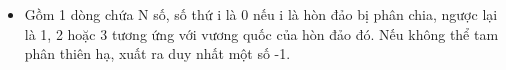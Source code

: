\begin{itemize}
	\item     Gồm 1 dòng chứa N số, số thứ i là 0 nếu i là hòn đảo bị phân chia, ngược lại là 1, 2 hoặc 3 tương ứng với vương quốc của hòn đảo đó. Nếu không thể tam phân thiên hạ, xuất ra duy nhất một số -1.   
\end{itemize}